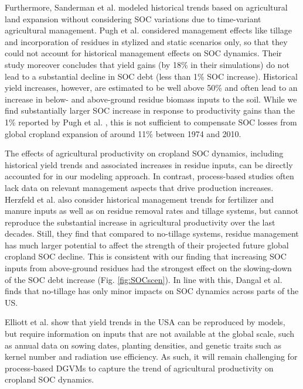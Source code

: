\documentclass[gc, manuscript]{copernicus}
\begin{document}
Furthermore, Sanderman et al. \citeyearpar{sanderman_soil_2017} modeled historical trends based on agricultural land expansion without considering SOC variations due to time-variant agricultural management. Pugh et al. \citeyearpar{pugh_simulated_2015} considered management effects like tillage and incorporation of residues in stylized and static scenarios only, so that they could not account for historical management effects on SOC dynamics. Their study moreover concludes that yield gains (by 18\% in their simulations) do not lead to a substantial decline in SOC debt (less than 1\% SOC increase). Historical yield increases, however, are estimated to be well above 50\% \citep{pellegrini_crop_2018, ray_recent_2012, rudel_agricultural_2009} and often lead to an increase in below- and above-ground residue biomass inputs to the soil. While we find substantially larger SOC increase in response to productivity gains than the 1\% reported by Pugh et al. \citeyearpar{pugh_simulated_2015}, this is not sufficient to compensate SOC losses from global cropland expansion of around 11\% between 1974 and 2010.

The effects of agricultural productivity on cropland SOC dynamics, including historical yield trends and associated increases in residue inputs, can be directly accounted for in our modeling approach. In contrast, process-based studies \citep{pugh_simulated_2015, herzfeld_soc_2021} often lack data on relevant management aspects that drive production increases. Herzfeld et al. \citeyearpar{herzfeld_soc_2021} also consider historical management trends for fertilizer and manure inputs as well as on residue removal rates and tillage systems, but cannot reproduce the substantial increase in agricultural productivity over the last decades. Still, they find that compared to no-tillage systems, residue management has much larger potential to affect the strength of their projected future global cropland SOC decline. This is consistent with our finding that increasing SOC inputs from above-ground residues had the strongest effect on the slowing-down of the SOC debt increase (Fig. \ref{fig:SOCscen}). In line with this, Dangal et al. \citeyearpar{dangal_improving_2022} finds that no-tillage has only minor impacts on SOC dynamics across parts of the US.

Elliott et al. \citeyearpar{elliott_management_trends_2018} show that yield trends in the USA can be reproduced by models, but require information on inputs that are not available at the global scale, such as annual data on sowing dates, planting densities, and genetic traits such as kernel number and radiation use efficiency. As such, it will remain challenging for process-based DGVMs to capture the trend of agricultural productivity on cropland SOC dynamics.
\end{document}
